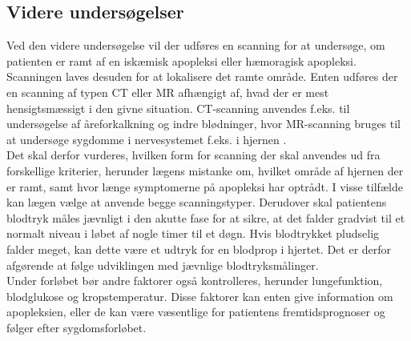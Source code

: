 \subsection{Videre undersøgelser}
Ved den videre undersøgelse vil der udføres en scanning for at undersøge, om patienten er ramt af en iskæmisk apopleksi eller hæmoragisk apopleksi. Scanningen laves desuden for at lokalisere det ramte område. Enten udføres der en scanning af typen CT eller MR afhængigt af, hvad der er mest hensigtsmæssigt i den givne situation. \cite{Sundhedsstyrelsen2009} %
CT-scanning anvendes f.eks. til undersøgelse af åreforkalkning og indre blødninger, hvor MR-scanning bruges til at undersøge sygdomme i nervesystemet f.eks. i hjernen \cite{Hansen2015,Ammundsen2015}.\\
Det skal derfor vurderes, hvilken form for scanning der skal anvendes ud fra forskellige kriterier, herunder lægens mistanke om, hvilket område af hjernen der er ramt, samt hvor længe symptomerne på apopleksi har optrådt. I visse tilfælde kan lægen vælge at anvende begge scanningstyper.  
Derudover skal patientens blodtryk måles jævnligt i den akutte fase for at sikre, at det falder gradvist til et normalt niveau i løbet af nogle timer til et døgn. Hvis blodtrykket pludselig falder meget, kan dette være et udtryk for en blodprop i hjertet. Det er derfor afgørende at følge udviklingen med jævnlige blodtryksmålinger. \cite{Sundhedsstyrelsen2009}
\\
Under forløbet bør andre faktorer også kontrolleres, herunder lungefunktion, blodglukose og kropstemperatur. Disse faktorer kan enten give information om apopleksien, eller de kan være væsentlige for patientens fremtidsprognoser og følger efter sygdomsforløbet. \cite{Sundhedsstyrelsen2009}
\\

